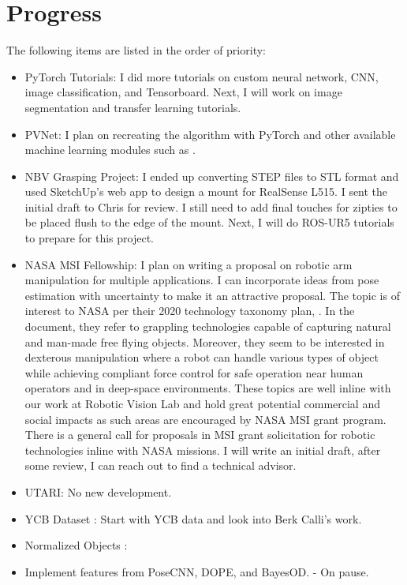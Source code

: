 \documentclass[11pt]{article}
\begin{document}
\section{Progress}
The following items are listed in the order of priority:
\begin{itemize}
      \item PyTorch Tutorials: I did more tutorials on custom neural network,
      CNN, image classification, and Tensorboard. Next, I will work on image
      segmentation and transfer learning tutorials.

      \item PVNet: I plan on recreating the algorithm with PyTorch and other
      available machine learning modules such as \cite{openmmla99:online}.

      \item NBV Grasping Project: I ended up converting STEP files to STL format
      and used SketchUp's web app to design a mount for RealSense L515. I sent
      the initial draft to Chris for review. I still need to add final touches
      for zipties to be placed flush to the edge of the mount. Next, I will do
      ROS-UR5 tutorials to prepare for this project.

      \item NASA MSI Fellowship: I plan on writing a proposal on robotic
      arm manipulation for multiple applications. I can incorporate ideas from pose
      estimation with uncertainty to make it an attractive proposal. The topic
      is of interest to NASA per their 2020 technology taxonomy plan, \cite{2020nasa40:online}. In the
      document, they refer to grappling technologies capable of capturing natural
      and man-made free flying objects. Moreover, they seem to be interested in
      dexterous manipulation where a robot can handle various types of object
      while achieving compliant force control for safe operation near human
      operators and in deep-space environments. These topics are well inline with
      our work at Robotic Vision Lab and hold great potential commercial and
      social impacts as such areas are encouraged by NASA MSI grant program.
      There is a general call for proposals in MSI grant solicitation for robotic
      technologies inline with NASA missions. I will write an initial draft,
      after some review, I can reach out to find a technical advisor.

      \item UTARI: No new development.

      \item YCB Dataset \cite{calli2015ycb}: Start with YCB data and look into
      Berk Calli's work.
      \item Normalized Objects \cite{Wang_2019_CVPR}:
      \item Implement features from PoseCNN, DOPE, and BayesOD. - On pause.
\end{itemize}
\end{document}
